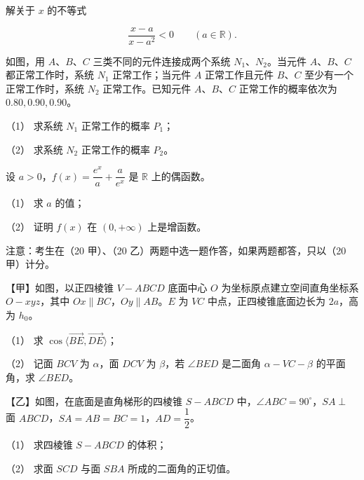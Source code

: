 \begin{question}
解关于 $x$ 的不等式

\nopagebreak[4]
\[
\frac{x-a}{x-a^2}<0\qquad(a\in\mathbb R).
\]

\Needspace{0.4\textheight}
\end{question}
\begin{question}
如图，用 $A$、$B$、$C$ 三类不同的元件连接成两个系统 $N_1$、$N_2$。当元件 $A$、$B$、$C$ 都正常工作时，系统 $N_1$ 正常工作；当元件 $A$ 正常工作且元件 $B$、$C$ 至少有一个正常工作时，系统 $N_2$ 正常工作。已知元件 $A$、$B$、$C$ 正常工作的概率依次为 $0.80,0.90,0.90$。
\nopagebreak[4]
\begin{center}\end{center}
\nopagebreak[4]
（1） 求系统 $N_1$ 正常工作的概率 $P_1$；

（2） 求系统 $N_2$ 正常工作的概率 $P_2$。

\end{question}
\begin{question}
设 $a>0$，$f(x)=\dfrac{e^x}{a}+\dfrac{a}{e^x}$ 是 $\mathbb R$ 上的偶函数。

（1） 求 $a$ 的值；

（2） 证明 $f(x)$ 在 $(0,+\infty)$ 上是增函数。

\Needspace{0.4\textheight}
\end{question}
\begin{question}
注意：考生在（20 甲）、（20 乙）两题中选一题作答，如果两题都答，只以（20 甲）计分。

【甲】如图，以正四棱锥 $V-ABCD$ 底面中心 $O$ 为坐标原点建立空间直角坐标系 $O-xyz$，其中 $Ox\parallel BC$，$Oy\parallel AB$。$E$ 为 $VC$ 中点，正四棱锥底面边长为 $2a$，高为 $h_0$。
\nopagebreak[4]
\begin{center}\end{center}
\nopagebreak[4]
（1） 求 $\cos\langle\overrightarrow{BE},\overrightarrow{DE}\rangle$；

（2） 记面 $BCV$ 为 $\alpha$，面 $DCV$ 为 $\beta$，若 $\angle BED$ 是二面角 $\alpha-VC-\beta$ 的平面角，求 $\angle BED$。

【乙】如图，在底面是直角梯形的四棱锥 $S-ABCD$ 中，$\angle ABC=90^\circ$，$SA\perp$ 面 $ABCD$，$SA=AB=BC=1$，$AD=\dfrac12$。
\nopagebreak[4]
\begin{center}\end{center}
\nopagebreak[4]
（1） 求四棱锥 $S-ABCD$ 的体积；

（2） 求面 $SCD$ 与面 $SBA$ 所成的二面角的正切值。

\Needspace{0.4\textheight}
\end{question}
